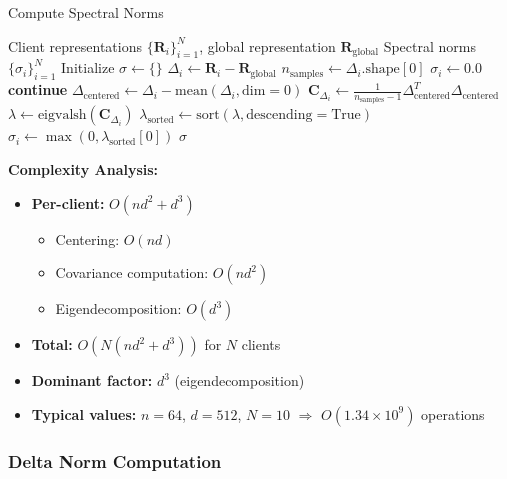 \documentclass[11pt,a4paper]{article}
\begin{document}
\begin{algorithm}[H]
\caption{Compute Spectral Norms}
\label{alg:spectral}
\begin{algorithmic}[1]
\Require Client representations $\{\mathbf{R}_i\}_{i=1}^{N}$, global representation $\mathbf{R}_{\text{global}}$
\Ensure Spectral norms $\{\sigma_i\}_{i=1}^{N}$
\State Initialize $\sigma \leftarrow \{\}$
    \State $\Delta_i \leftarrow \mathbf{R}_i - \mathbf{R}_{\text{global}}$ 
    \State $n_{\text{samples}} \leftarrow \Delta_i.\text{shape}[0]$
        \State $\sigma_i \leftarrow 0.0$ 
        \State \textbf{continue}
    \EndIf
    \State $\Delta_{\text{centered}} \leftarrow \Delta_i - \text{mean}(\Delta_i, \text{dim}=0)$ 
    \State $\mathbf{C}_{\Delta_i} \leftarrow \frac{1}{n_{\text{samples}} - 1} \Delta_{\text{centered}}^T \Delta_{\text{centered}}$ 
    \State $\lambda \leftarrow \text{eigvalsh}(\mathbf{C}_{\Delta_i})$ 
    \State $\lambda_{\text{sorted}} \leftarrow \text{sort}(\lambda, \text{descending}=\text{True})$
    \State $\sigma_i \leftarrow \max(0, \lambda_{\text{sorted}}[0])$ 
\EndFor
\State \Return $\sigma$
\end{algorithmic}
\end{algorithm}

\textbf{Complexity Analysis:}
\begin{itemize}
    \item \textbf{Per-client:} $O(nd^2 + d^3)$
    \begin{itemize}
        \item Centering: $O(nd)$
        \item Covariance computation: $O(nd^2)$
        \item Eigendecomposition: $O(d^3)$
    \end{itemize}
    \item \textbf{Total:} $O(N(nd^2 + d^3))$ for $N$ clients
    \item \textbf{Dominant factor:} $d^3$ (eigendecomposition)
    \item \textbf{Typical values:} $n=64$, $d=512$, $N=10$ $\Rightarrow$ $O(1.34 \times 10^9)$ operations
\end{itemize}

\subsubsection{Delta Norm Computation}
\end{document}

